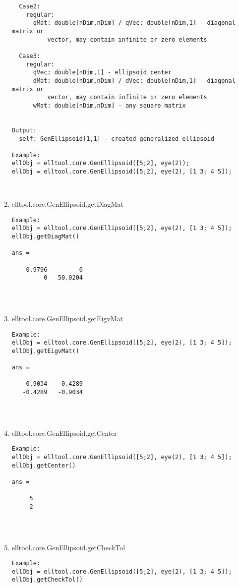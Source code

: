 \begin{enumerate}
\begin{lstlisting}
  Case2:
    regular:
      qMat: double[nDim,nDim] / qVec: double[nDim,1] - diagonal matrix or
          vector, may contain infinite or zero elements

  Case3:
    regular:
      qVec: double[nDim,1] - ellipsoid center
      dMat: double[nDim,nDim] / dVec: double[nDim,1] - diagonal matrix or
          vector, may contain infinite or zero elements
      wMat: double[nDim,nDim] - any square matrix


Output:
  self: GenEllipsoid[1,1] - created generalized ellipsoid

Example:
ellObj = elltool.core.GenEllipsoid([5;2], eye(2));
ellObj = elltool.core.GenEllipsoid([5;2], eye(2), [1 3; 4 5]);



\end{lstlisting}
\fontfamily{\familydefault}
\selectfont
\item {elltool.core.GenEllipsoid.getDiagMat}
\selectfont
\begin{lstlisting}
Example:
ellObj = elltool.core.GenEllipsoid([5;2], eye(2), [1 3; 4 5]);
ellObj.getDiagMat()

ans =

    0.9796         0
         0   50.0204




\end{lstlisting}
\fontfamily{\familydefault}
\selectfont
\item {elltool.core.GenEllipsoid.getEigvMat}
\selectfont
\begin{lstlisting}
Example:
ellObj = elltool.core.GenEllipsoid([5;2], eye(2), [1 3; 4 5]);
ellObj.getEigvMat()

ans =

    0.9034   -0.4289
   -0.4289   -0.9034




\end{lstlisting}
\fontfamily{\familydefault}
\selectfont
\item {elltool.core.GenEllipsoid.getCenter}
\selectfont
\begin{lstlisting}
Example:
ellObj = elltool.core.GenEllipsoid([5;2], eye(2), [1 3; 4 5]);
ellObj.getCenter()

ans =

     5
     2




\end{lstlisting}
\fontfamily{\familydefault}
\selectfont
\item {elltool.core.GenEllipsoid.getCheckTol}
\selectfont
\begin{lstlisting}
Example:
ellObj = elltool.core.GenEllipsoid([5;2], eye(2), [1 3; 4 5]);
ellObj.getCheckTol()


\end{lstlisting}
\end{enumerate}
